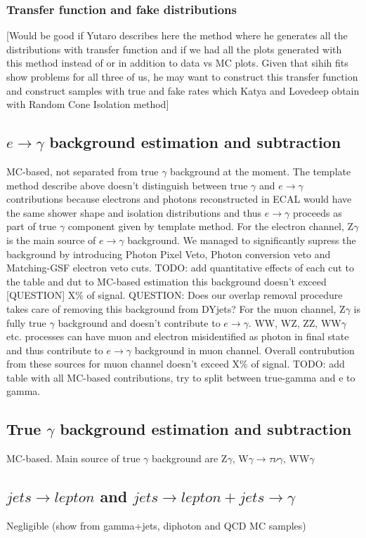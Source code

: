 \subsubsection{Transfer function and fake distributions}
[Would be good if Yutaro describes here the method where he generates all the distributions with transfer function and if we had all the plots generated with this method instead of or in addition to data vs MC plots. Given that sihih fits show problems for all three of us, he may want to construct this transfer function and construct samples with true and fake rates which Katya and Lovedeep obtain with Random Cone Isolation method]

\subsection{$e \rightarrow \gamma$ background estimation and subtraction}
MC-based, not separated from true $\gamma$ background at the moment. The template method describe above doesn't distinguish between true $\gamma$ and $e \rightarrow \gamma$ contributions because electrons and photons reconstructed in ECAL would have the same shower shape and isolation distributions and thus $e \rightarrow \gamma$ proceeds as part of true $\gamma$ component given by template method.
For the electron channel, Z$\gamma$ is the main source of $e \rightarrow \gamma$ background. We managed to significantly supress the background by introducing Photon Pixel Veto, Photon conversion veto and Matching-GSF electron veto cuts. TODO: add quantitative effects of each cut to the table and dut to MC-based estimation this background doesn't exceed [QUESTION] X\% of signal. 
QUESTION: Does our overlap removal procedure takes care of removing this background from DYjets?
For the muon channel,  Z$\gamma$ is fully true $\gamma$ background and doesn't contribute to $e \rightarrow \gamma$. WW, WZ, ZZ, WW$\gamma$ etc. processes can have muon and electron misidentified as photon in final state and thus contribute to $e \rightarrow \gamma$ background in muon channel. Overall contrubution from these sources for muon channel doesn't exceed X\% of signal.
TODO: add table with all MC-based contributions, try to split between true-gamma and e to gamma. 

\subsection{True $\gamma$ background estimation and subtraction}
MC-based. Main source of true $\gamma$ background are Z$\gamma$, W$\gamma \rightarrow \tau \nu \gamma$, WW$\gamma$

\subsection{$jets \rightarrow lepton$ and $jets \rightarrow lepton + jets \rightarrow \gamma$}
Negligible (show from gamma+jets, diphoton and QCD MC samples)

